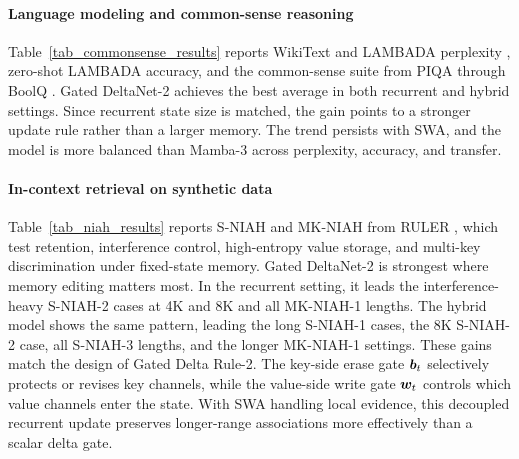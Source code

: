 \documentclass[10pt, logo, onecolumn, copyright]{nv}
\begin{document}
\paragraph{Language modeling and common-sense reasoning}
Table~\ref{tab_commonsense_results} reports WikiText and LAMBADA perplexity \citep{merity2016pointer,paperno_lambada_2016}, zero-shot LAMBADA accuracy, and the common-sense suite from PIQA through BoolQ \citep{bisk2020piqa,zellers2019hellaswag,sakaguchi2021winogrande,arc-ce,openbookqa,sap2019social,clark2019boolq}. Gated DeltaNet-2 achieves the best average in both recurrent and hybrid settings. Since recurrent state size is matched, the gain points to a stronger update rule rather than a larger memory. The trend persists with SWA, and the model is more balanced than Mamba-3 across perplexity, accuracy, and transfer.



\paragraph{In-context retrieval on synthetic data}
Table~\ref{tab_niah_results} reports S-NIAH and MK-NIAH from RULER \citep{hsieh2024ruler}, which test retention, interference control, high-entropy value storage, and multi-key discrimination under fixed-state memory. Gated DeltaNet-2 is strongest where memory editing matters most. In the recurrent setting, it leads the interference-heavy S-NIAH-2 cases at 4K and 8K and all MK-NIAH-1 lengths. The hybrid model shows the same pattern, leading the long S-NIAH-1 cases, the 8K S-NIAH-2 case, all S-NIAH-3 lengths, and the longer MK-NIAH-1 settings. These gains match the design of Gated Delta Rule-2. The key-side erase gate ${\bm{b}}_t$ selectively protects or revises key channels, while the value-side write gate ${\bm{w}}_t$ controls which value channels enter the state. With SWA handling local evidence, this decoupled recurrent update preserves longer-range associations more effectively than a scalar delta gate.
\end{document}
